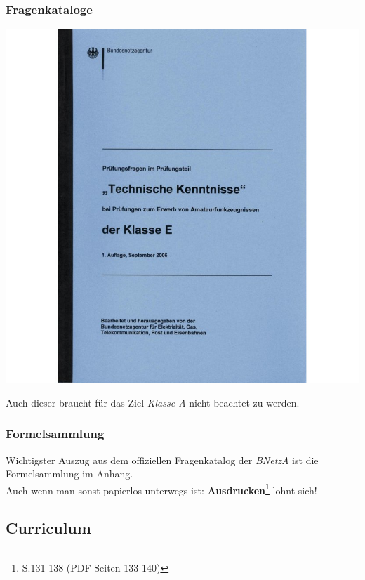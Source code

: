 \begin{frame}
    \frametitle{Fragenkataloge}

    \begin{center}
        \includegraphics[height=0.7\textheight]{e00/Fragenkatalog-Klasse-E-Technische-Kenntnisse.jpg}
        \tiny \hyperlink{refs}{\cite{darcv}}
    \end{center}

    Auch dieser braucht für das Ziel \emph{Klasse A} nicht beachtet zu werden.

\end{frame}

\begin{frame}
    \frametitle{Formelsammlung}

    Wichtigster Auszug aus dem offiziellen Fragenkatalog der \emph{BNetzA} ist
    die Formelsammlung im Anhang. \\[3em]

    Auch wenn man sonst papierlos unterwegs ist:
    \textbf{Ausdrucken}\footnote{S.131-138 (PDF-Seiten 133-140)} lohnt sich!

\end{frame}

\subsection{Curriculum}

